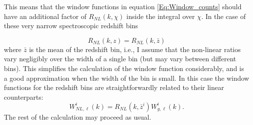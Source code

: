This means that the window functions in equation \ref{Eq:Window_counts} should have an additional factor of $R_{NL}(k,\chi)$ inside the integral over $\chi$. In the case of these very narrow spectroscopic redshift bins

\begin{equation}
R_{NL}(k,z) = R_{NL}(k,\bar{z})
\end{equation}
where $\bar{z}$ is the mean of the redshift bin, i.e., I assume that the non-linear ratios vary negligibly over the width of a single bin (but may vary between different bins). This simplifies the calculation of the window function considerably, and is a good approximation when the width of the bin is small. In this case the window functions for the redshift bins are straightforwardly related to their linear counterparts:
\begin{equation}
W^i_{NL,\ell}(k) = R_{NL}(k,\bar{z}^i)W^i_{g,\ell}(k).
\end{equation}
The rest of the calculation may proceed as usual. 

